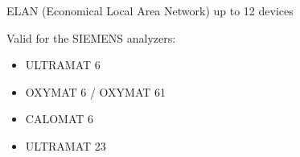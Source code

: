 ELAN (Economical Local Area Network)
up to 12 devices

Valid for the SIEMENS analyzers:
\begin{itemize}
\item ULTRAMAT 6
\item OXYMAT 6 / OXYMAT 61
\item CALOMAT 6
\item ULTRAMAT 23
\end{itemize}
